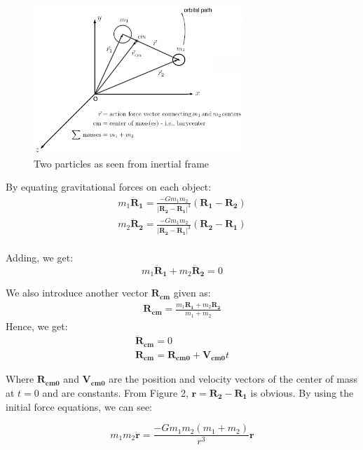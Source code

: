 \documentclass[12pt, letterpaper]{article}
\begin{document}
\begin{figure}[h]
	\centering
    \includegraphics[width = 300px]{Twobodies}
    \caption{Two particles as seen from inertial frame}
\end{figure}

By equating gravitational forces on each object:
\begin{gather*}
m_1\mathbf{\ddot{R}_{1}} = \frac{-Gm_1m_2}{|\mathbf{R_2} - \mathbf{R_1}|^3}(\mathbf{R_1} - \mathbf{R_2})\\
m_2\mathbf{\ddot{R}_{2}} = \frac{-Gm_1m_2}{|\mathbf{R_2} - \mathbf{R_1}|^3}(\mathbf{R_2} - \mathbf{R_1})\\
\end{gather*}

Adding, we get:
\begin{displaymath}
m_1\mathbf{\ddot{R}_{1}}  + m_2\mathbf{\ddot{R}_{2}} = 0
\end{displaymath}

We also introduce another vector $\mathbf{R_{cm}}$ given as:
\begin{gather*}
\mathbf{R_{cm}} = \frac{m_1\mathbf{R_1}+m_2\mathbf{R_2}}{m_1 + m_2}
\end{gather*}
Hence, we get:
\begin{gather*}
\mathbf{\ddot{R}_{cm}} = 0 \\
\mathbf{R_{cm}} = \mathbf{R_{cm0}} + \mathbf{V_{cm0}}t
\end{gather*}

Where $\mathbf{R_{cm0}}$ and $\mathbf{V_{cm0}}$ are the position and velocity vectors of the center of mass at $t=0$ and are constants. From Figure 2, $\mathbf{r} = \mathbf{R_2} - \mathbf{R_1}$ is obvious. By using the initial force equations, we can see:

\begin{displaymath}
m_1m_2 \mathbf{\ddot{r}} = \frac{-Gm_1m_2(m_1+m_2)}{r^3}\mathbf{r}
\end{displaymath}
\end{document}

